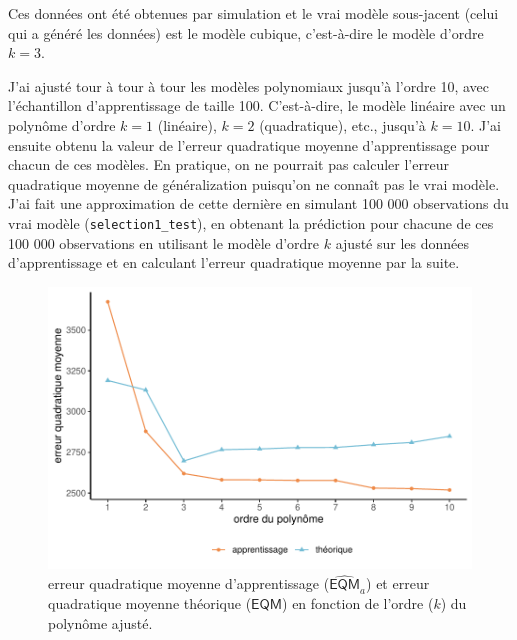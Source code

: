 \documentclass[
  11pt,
  letterpaper,
]{scrbook}
\theoremstyle{definition}
\theoremstyle{remark}
\begin{document}
Ces données ont été obtenues par simulation et le vrai modèle
sous-jacent (celui qui a généré les données) est le modèle cubique,
c'est-à-dire le modèle d'ordre \(k=3\).

J'ai ajusté tour à tour à tour les modèles polynomiaux jusqu'à l'ordre
10, avec l'échantillon d'apprentissage de taille 100. C'est-à-dire, le
modèle linéaire avec un polynôme d'ordre \(k=1\) (linéaire), \(k=2\)
(quadratique), etc., jusqu'à \(k=10\). J'ai ensuite obtenu la valeur de
l'erreur quadratique moyenne d'apprentissage pour chacun de ces modèles.
En pratique, on ne pourrait pas calculer l'erreur quadratique moyenne de
généralization puisqu'on ne connaît pas le vrai modèle. J'ai fait une
approximation de cette dernière en simulant 100 000 observations du vrai
modèle (\texttt{selection1\_test}), en obtenant la prédiction pour
chacune de ces 100 000 observations en utilisant le modèle d'ordre \(k\)
ajusté sur les données d'apprentissage et en calculant l'erreur
quadratique moyenne par la suite.

\begin{figure}[ht!]

{\centering \includegraphics[width=1\textwidth,height=\textheight]{./04-selectionmodeles_files/figure-pdf/fig-plotEQMa-1.pdf}

}

\caption{\label{fig-plotEQMa}erreur quadratique moyenne d'apprentissage
(\(\widehat{\mathsf{EQM}}_a\)) et erreur quadratique moyenne théorique
(\(\mathsf{EQM}\)) en fonction de l'ordre (\(k\)) du polynôme ajusté.}

\end{figure}
\end{document}
